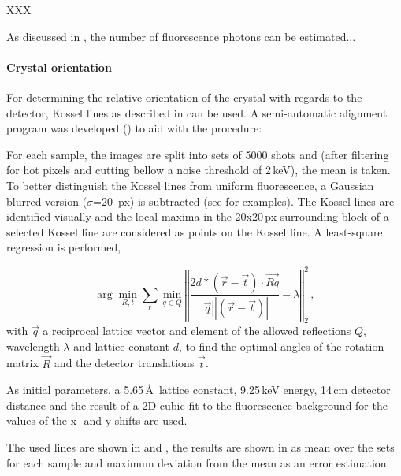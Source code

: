 XXX


As discussed in , the number of fluorescence photons can be estimated...




\paragraph{Crystal orientation}
For determining the relative orientation of the crystal with regards to the detector, Kossel lines as described in  can be used.  A semi-automatic alignment program was developed () to aid with the procedure: 

For each sample, the images are split into sets of 5000 shots and (after filtering for hot pixels and cutting bellow a noise threshold of 2\,keV), the mean is taken. To better distinguish the Kossel lines from uniform fluorescence, a Gaussian blurred version ($\sigma$=20\, px) is subtracted (see  for examples). The Kossel lines are identified visually and the local maxima in the 20x20\,px surrounding block of a selected Kossel line are considered as points on the Kossel line. A least-square regression is performed,

\begin{equation}
	\arg\!\min_{R,t} \sum_{r} \min_{q\in Q} \left\Vert \frac{2 d * \left( \vec{r} - \vec{t} \right) \cdot \vec{Rq}}{\left|\vec{q}\right| \left| \left(\vec{r}-\vec{t}\right)\right|} -\lambda \right\Vert_2^2 \,,
\end{equation}
with
$\vec{q}$ a reciprocal lattice vector and element of the allowed reflections $Q$, wavelength $\lambda$ and lattice constant $d$, to find
 the optimal angles of the rotation matrix $\vec{R}$ and the detector translations $\vec{t}$.

As initial parameters, a 5.65\,\AA\, lattice constant, 9.25\,keV energy, 14\,cm detector distance and the result of a 2D cubic fit to the fluorescence background for the values of the x- and y-shifts are used. 

The used lines are shown in  and , the results are shown in  as mean over the sets for each sample and maximum deviation from the mean as an error estimation.


